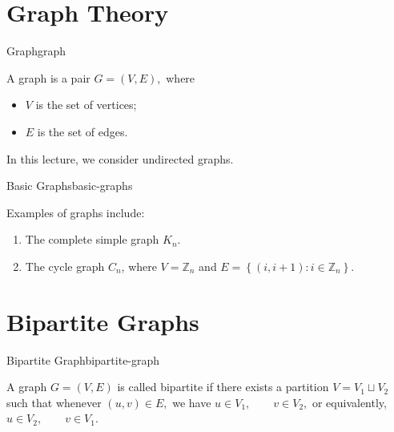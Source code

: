 \section{Graph Theory}

\begin{definition}{Graph}{graph}

A graph is a pair
\(
G=(V,E),
\)
where

\begin{itemize}
    \item $V$ is the set of vertices;
    \item $E$ is the set of edges.
\end{itemize}

In this lecture, we consider undirected graphs.

\end{definition}


\begin{example}{Basic Graphs}{basic-graphs}

Examples of graphs include:

\begin{enumerate}

    \item The complete simple graph $K_n$.

    \item The cycle graph $C_n$, where
    \(
    V=\mathbb{Z}_n
    \)
    and
    \(
    E
    =
    \left\{
    (i,i+1):i\in\mathbb{Z}_n
    \right\}.
    \)

\end{enumerate}

\end{example}


\section{Bipartite Graphs}

\begin{definition}{Bipartite Graph}{bipartite-graph}

A graph $G=(V,E)$ is called bipartite if there exists a partition
\(
V=V_1\sqcup V_2
\)
such that whenever
\(
(u,v)\in E,
\)
we have
\(
u\in V_1,\qquad v\in V_2,
\)
or equivalently,
\(
u\in V_2,\qquad v\in V_1.
\)

\end{definition}


